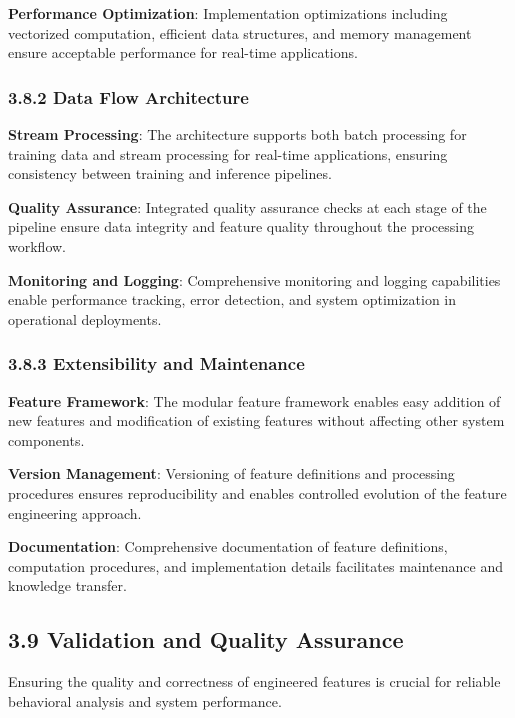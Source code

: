 \documentclass[
  11pt,
  a4paper,
]{article}
\begin{document}
\textbf{Performance Optimization}: Implementation optimizations
including vectorized computation, efficient data structures, and memory
management ensure acceptable performance for real-time applications.

\subsubsection{3.8.2 Data Flow
Architecture}\label{data-flow-architecture}

\textbf{Stream Processing}: The architecture supports both batch
processing for training data and stream processing for real-time
applications, ensuring consistency between training and inference
pipelines.

\textbf{Quality Assurance}: Integrated quality assurance checks at each
stage of the pipeline ensure data integrity and feature quality
throughout the processing workflow.

\textbf{Monitoring and Logging}: Comprehensive monitoring and logging
capabilities enable performance tracking, error detection, and system
optimization in operational deployments.

\subsubsection{3.8.3 Extensibility and
Maintenance}\label{extensibility-and-maintenance}

\textbf{Feature Framework}: The modular feature framework enables easy
addition of new features and modification of existing features without
affecting other system components.

\textbf{Version Management}: Versioning of feature definitions and
processing procedures ensures reproducibility and enables controlled
evolution of the feature engineering approach.

\textbf{Documentation}: Comprehensive documentation of feature
definitions, computation procedures, and implementation details
facilitates maintenance and knowledge transfer.

\subsection{3.9 Validation and Quality
Assurance}\label{validation-and-quality-assurance}

Ensuring the quality and correctness of engineered features is crucial
for reliable behavioral analysis and system performance.
\end{document}
